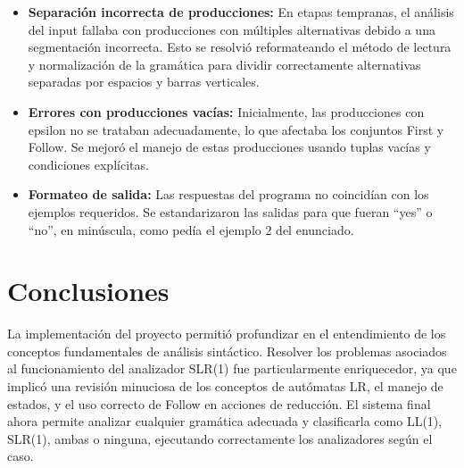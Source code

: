 \documentclass[11pt]{article}
\begin{document}
\begin{itemize}
    \item \textbf{Separación incorrecta de producciones:} En etapas tempranas, el análisis del input fallaba con producciones con múltiples alternativas debido a una segmentación incorrecta. Esto se resolvió reformateando el método de lectura y normalización de la gramática para dividir correctamente alternativas separadas por espacios y barras verticales.
    
    \item \textbf{Errores con producciones vacías:} Inicialmente, las producciones con epsilon no se trataban adecuadamente, lo que afectaba los conjuntos First y Follow. Se mejoró el manejo de estas producciones usando tuplas vacías y condiciones explícitas.

    \item \textbf{Formateo de salida:} Las respuestas del programa no coincidían con los ejemplos requeridos. Se estandarizaron las salidas para que fueran ``yes'' o ``no'', en minúscula, como pedía el ejemplo 2 del enunciado.
\end{itemize}

\section*{Conclusiones}

La implementación del proyecto permitió profundizar en el entendimiento de los conceptos fundamentales de análisis sintáctico. Resolver los problemas asociados al funcionamiento del analizador SLR(1) fue particularmente enriquecedor, ya que implicó una revisión minuciosa de los conceptos de autómatas LR, el manejo de estados, y el uso correcto de Follow en acciones de reducción. El sistema final ahora permite analizar cualquier gramática adecuada y clasificarla como LL(1), SLR(1), ambas o ninguna, ejecutando correctamente los analizadores según el caso.
\end{document}

